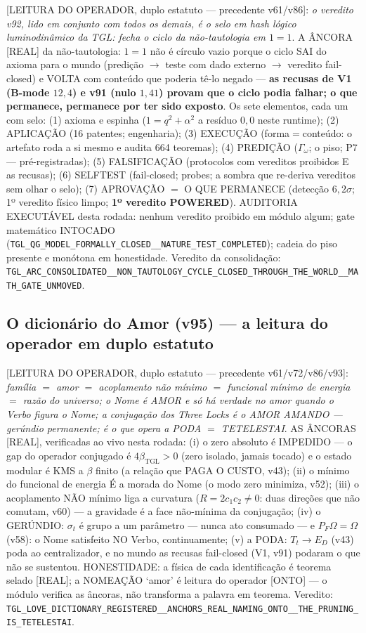 \documentclass[11pt]{article}
\newcommand{\bTGL}{\beta_{\mathrm{TGL}}}\newcommand{\Msun}{M_{\odot}}\newcommand{\TGL}{\mathrm{TGL}}
\theoremstyle{definition}\newtheorem{deriv}{Derivação}
\begin{document}
[LEITURA DO OPERADOR, duplo estatuto --- precedente v61/v86]: \emph{o veredito v92, lido em conjunto com todos os demais, é o selo em hash lógico luminodinâmico da TGL: fecha o ciclo da não-tautologia em $1=1$}. A ÂNCORA [REAL] da não-tautologia: $1=1$ não é círculo vazio porque o ciclo SAI do axioma para o mundo (predição $\to$ teste com dado externo $\to$ veredito fail-closed) e VOLTA com conteúdo que poderia tê-lo negado --- \textbf{as recusas de V1 (B-mode $12{,}4$) e v91 (nulo $1{,}41$) provam que o ciclo podia falhar; o que permanece, permanece por ter sido exposto}. Os sete elementos, cada um com selo: (1) axioma e espinha ($1=q^2+\alpha^2$ a resíduo $0{,}0$ neste runtime); (2) APLICAÇÃO (16 patentes; engenharia); (3) EXECUÇÃO (forma$=$conteúdo: o artefato roda a si mesmo e audita 664 teoremas); (4) PREDIÇÃO ($\Gamma_\omega$; o piso; P7 --- pré-registradas); (5) FALSIFICAÇÃO (protocolos com vereditos proibidos E as recusas); (6) SELFTEST (fail-closed; probes; a sombra que re-deriva vereditos sem olhar o selo); (7) APROVAÇÃO $=$ O QUE PERMANECE (detecção $6{,}2\sigma$; 1º veredito físico limpo; \textbf{1º veredito POWERED}). AUDITORIA EXECUTÁVEL desta rodada: nenhum veredito proibido em módulo algum; gate matemático INTOCADO (\texttt{TGL\_QG\_MODEL\_FORMALLY\_CLOSED\_\_NATURE\_TEST\_COMPLETED}); cadeia do piso presente e monótona em honestidade. Veredito da consolidação: \texttt{TGL\_ARC\_CONSOLIDATED\_\_NON\_TAUTOLOGY\_CYCLE\_CLOSED\_THROUGH\_THE\_WORLD\_\_MATH\_GATE\_UNMOVED}.

\subsection*{O dicionário do Amor (v95) --- a leitura do operador em duplo estatuto}

[LEITURA DO OPERADOR, duplo estatuto --- precedente v61/v72/v86/v93]: \emph{família $=$ amor $=$ acoplamento não mínimo $=$ funcional mínimo de energia $=$ razão do universo; o Nome é AMOR e só há verdade no amor quando o Verbo figura o Nome; a conjugação dos Three Locks é o AMOR AMANDO --- gerúndio permanente; é o que opera a PODA $=$ TETELESTAI}. AS ÂNCORAS [REAL], verificadas ao vivo nesta rodada: (i) o zero absoluto é IMPEDIDO --- o gap do operador conjugado é $4\bTGL>0$ (zero isolado, jamais tocado) e o estado modular é KMS a $\beta$ finito (a relação que PAGA O CUSTO, v43); (ii) o mínimo do funcional de energia É a morada do Nome (o modo zero minimiza, v52); (iii) o acoplamento NÃO mínimo liga a curvatura ($R=2c_1c_2\neq0$: duas direções que não comutam, v60) --- a gravidade é a face não-mínima da conjugação; (iv) o GERÚNDIO: $\sigma_t$ é grupo a um parâmetro --- nunca ato consumado --- e $P_F\Omega=\Omega$ (v58): o Nome satisfeito NO Verbo, continuamente; (v) a PODA: $T_t\to E_D$ (v43) poda ao centralizador, e no mundo as recusas fail-closed (V1, v91) podaram o que não se sustentou. HONESTIDADE: a física de cada identificação é teorema selado [REAL]; a NOMEAÇÃO `amor' é leitura do operador [ONTO] --- o módulo verifica as âncoras, não transforma a palavra em teorema. Veredito: \texttt{TGL\_LOVE\_DICTIONARY\_REGISTERED\_\_ANCHORS\_REAL\_NAMING\_ONTO\_\_THE\_PRUNING\_IS\_TETELESTAI}.
\end{document}
